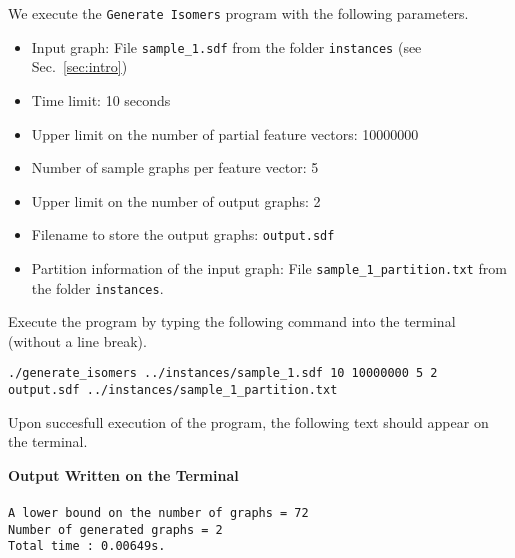 \documentclass[11pt,titlepage,dvipdfmx,twoside]{article}
\begin{document}
We execute the {\tt Generate Isomers} program with the following parameters.

\begin{itemize}
\item Input graph: File {\tt sample\_1.sdf} from the folder {\tt instances} (see Sec.~\ref{sec:intro})
\item Time limit: 10 seconds
\item Upper limit on the number of partial feature vectors: 10000000
\item Number of sample graphs per feature vector: 5
\item Upper limit on the number of output graphs: 2
\item Filename to store the output graphs: {\tt output.sdf}
\item Partition information of the input graph: File {\tt sample\_1\_partition.txt} from the folder {\tt instances}.
\end{itemize}

Execute the program by typing the following command into the terminal (without a line break).

\bigskip


{\tt ./generate\_isomers ../instances/sample\_1.sdf 10 10000000 5 2} \\
 {\tt output.sdf ../instances/sample\_1\_partition.txt}	


\bigskip

Upon succesfull execution of the program, the following text should appear on the terminal.

\begin{oframed}
{\bf Output Written on the Terminal}\\\\
{\tt A lower bound on the number of graphs = 72\\
Number of generated graphs = 2\\
Total time : 0.00649s.}
\end{oframed}
\end{document}
